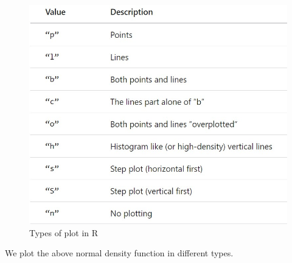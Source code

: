 \documentclass[
]{book}
\begin{document}
\begin{figure}

{\centering \includegraphics[width=0.7\linewidth]{img01/w01-plotType} 

}

\caption{Types of plot in R}\label{fig:unnamed-chunk-5}
\end{figure}

We plot the above normal density function in different types.
\end{document}
